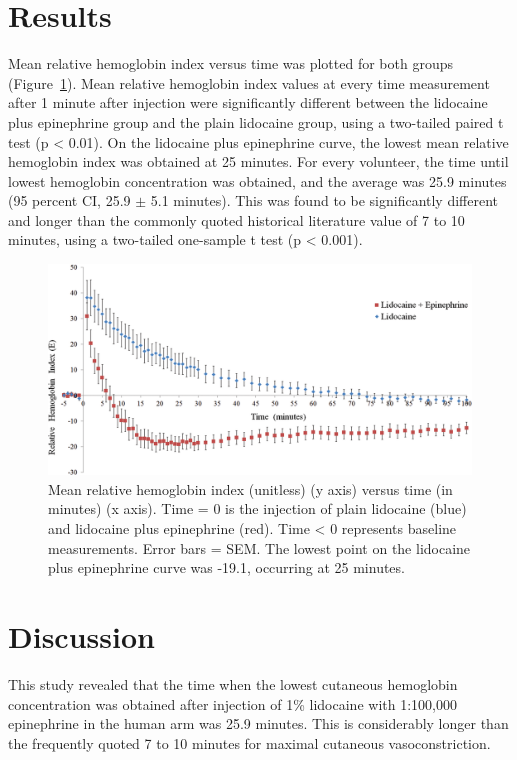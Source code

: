 \section{Results}
Mean relative hemoglobin index versus time was plotted for both groups (Figure~\ref{fig:p2-mckee_fig}). Mean relative hemoglobin index values at every time measurement after 1 minute after injection were significantly different between the lidocaine plus epinephrine group and the plain lidocaine group, using a two-tailed paired t test (p < 0.01). On the lidocaine plus epinephrine curve, the lowest mean relative hemoglobin index was obtained at 25 minutes. For every volunteer, the time until lowest hemoglobin concentration was obtained, and the average was 25.9 minutes (95 percent CI, 25.9 $\pm$ 5.1 minutes). This was found to be significantly different and longer than the commonly quoted historical literature value of 7 to 10 minutes, using a two-tailed one-sample t test (p < 0.001).

\begin{figure}
	\centering \includegraphics[width=1.0\textwidth]{figures/p2-mckee_fig.png}
	\caption[Sample time course of lidocaine and epinephrine]{\label{fig:p2-mckee_fig} Mean relative hemoglobin index (unitless) (y axis) versus time (in minutes) (x axis). Time = 0 is the injection of plain lidocaine (blue) and lidocaine plus epinephrine (red). Time < 0 represents baseline measurements. Error bars = SEM. The lowest point on the lidocaine plus epinephrine curve was -19.1, occurring at 25 minutes.}
\end{figure}

\section{Discussion}
This study revealed that the time when the lowest cutaneous hemoglobin concentration was obtained after injection of 1\% lidocaine with 1:100,000 epinephrine in the human arm was 25.9 minutes. This is considerably longer than the frequently quoted 7 to 10 minutes for maximal cutaneous vasoconstriction.\cite{Larrabee1987}


